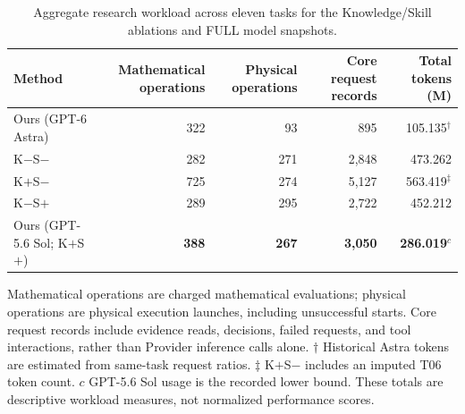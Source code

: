 \begin{table}[t]
\centering
\caption{Aggregate research workload across eleven tasks for the Knowledge/Skill ablations and FULL model snapshots.}
\label{tab:resource-ablation}
\small
\setlength{\tabcolsep}{8pt}
\renewcommand{\arraystretch}{1.15}
\begin{tabularx}{\textwidth}{@{}Xrrrr@{}}
\toprule
Method & Mathematical operations & Physical operations & Core request records & Total tokens (M) \\
\midrule
Ours (GPT-6 Astra) & 322 & 93 & 895 & 105.135$^{\dagger}$ \\
K$-$S$-$ & 282 & 271 & 2,848 & 473.262 \\
K$+$S$-$ & 725 & 274 & 5,127 & 563.419$^{\ddagger}$ \\
K$-$S$+$ & 289 & 295 & 2,722 & 452.212 \\
Ours (GPT-5.6 Sol; K$+$S$+$) & \textbf{388} & \textbf{267} & \textbf{3,050} & \textbf{286.019$^{c}$} \\
\bottomrule
\end{tabularx}
\vspace{3pt}

\noindent\scriptsize
Mathematical operations are charged mathematical evaluations; physical operations are physical execution launches, including unsuccessful starts. Core request records include evidence reads, decisions, failed requests, and tool interactions, rather than Provider inference calls alone. $\dagger$ Historical Astra tokens are estimated from same-task request ratios. $\ddagger$ K$+$S$-$ includes an imputed T06 token count. $c$ GPT-5.6 Sol usage is the recorded lower bound. These totals are descriptive workload measures, not normalized performance scores.
\end{table}
